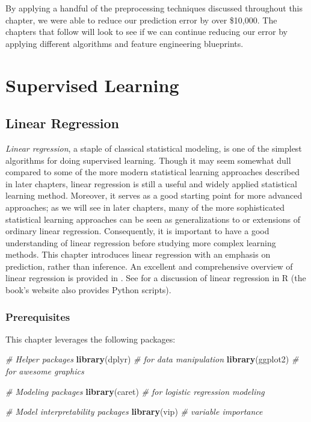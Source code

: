 \documentclass[]{krantz}
\makeatletter
\newenvironment{Shaded}{\begin{snugshade}}{\end{snugshade}}
\newcommand{\CommentTok}[1]{\textcolor[rgb]{0.37,0.37,0.37}{\textit{#1}}}
\newcommand{\KeywordTok}[1]{\textcolor[rgb]{0.27,0.27,0.27}{\textbf{#1}}}
\newcommand{\NormalTok}[1]{#1}
\newenvironment{kframe}{%
\medskip{}
\setlength{\fboxsep}{.8em}
 \def\at@end@of@kframe{}%
 \ifinner\ifhmode%
  \def\at@end@of@kframe{\end{minipage}}%
  \begin{minipage}{\columnwidth}%
 \fi\fi%
 \def\FrameCommand##1{\hskip\@totalleftmargin \hskip-\fboxsep
 \colorbox{shadecolor}{##1}\hskip-\fboxsep
     \hskip-\linewidth \hskip-\@totalleftmargin \hskip\columnwidth}%
 \MakeFramed {\advance\hsize-\width
   \@totalleftmargin\z@ \linewidth\hsize
   \@setminipage}}%
 {\par\unskip\endMakeFramed%
 \at@end@of@kframe}
\renewenvironment{Shaded}{\begin{kframe}}{\end{kframe}}
\makeatother
\begin{document}
By applying a handful of the preprocessing techniques discussed throughout this chapter, we were able to reduce our prediction error by over \$10,000. The chapters that follow will look to see if we can continue reducing our error by applying different algorithms and feature engineering blueprints.

\hypertarget{part-supervised-learning}{%
\part{Supervised Learning}\label{part-supervised-learning}}

\hypertarget{linear-regression}{%
\chapter{Linear Regression}\label{linear-regression}}

\emph{Linear regression}, a staple of classical statistical modeling, is one of the simplest algorithms for doing supervised learning. Though it may seem somewhat dull compared to some of the more modern statistical learning approaches described in later chapters, linear regression is still a useful and widely applied statistical learning method. Moreover, it serves as a good starting point for more advanced approaches; as we will see in later chapters, many of the more sophisticated statistical learning approaches can be seen as generalizations to or extensions of ordinary linear regression. Consequently, it is important to have a good understanding of linear regression before studying more complex learning methods. This chapter introduces linear regression with an emphasis on prediction, rather than inference. An excellent and comprehensive overview of linear regression is provided in \citet{kutner-2005-applied}. See \citet{faraway-2016-linear} for a discussion of linear regression in R (the book's website also provides Python scripts).

\hypertarget{prerequisites-2}{%
\section{Prerequisites}\label{prerequisites-2}}

This chapter leverages the following packages:

\begin{Shaded}
\begin{Highlighting}[]
\CommentTok{# Helper packages}
\KeywordTok{library}\NormalTok{(dplyr)    }\CommentTok{# for data manipulation}
\KeywordTok{library}\NormalTok{(ggplot2)  }\CommentTok{# for awesome graphics}

\CommentTok{# Modeling packages}
\KeywordTok{library}\NormalTok{(caret)    }\CommentTok{# for logistic regression modeling}

\CommentTok{# Model interpretability packages}
\KeywordTok{library}\NormalTok{(vip)      }\CommentTok{# variable importance}
\end{Highlighting}
\end{Shaded}
\end{document}

